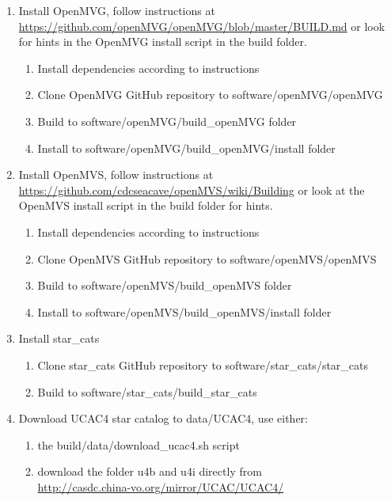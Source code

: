 \begin{enumerate}
\begin{enumerate}
    \end{enumerate}{}
    \item Install OpenMVG, follow instructions at \\ \url{https://github.com/openMVG/openMVG/blob/master/BUILD.md} or look for hints in the OpenMVG install script in the build folder.
    \begin{enumerate}
        \item Install dependencies according to instructions
        \item Clone OpenMVG GitHub repository to software/openMVG/openMVG 
        \item Build to software/openMVG/build\_openMVG folder
        \item Install to software/openMVG/build\_openMVG/install folder
    \end{enumerate}
    \item Install OpenMVS, follow instructions at \\ \url{https://github.com/cdcseacave/openMVS/wiki/Building} or look at the OpenMVS install script in the build folder for hints.
    \begin{enumerate}
        \item Install dependencies according to instructions
        \item Clone OpenMVS GitHub repository to software/openMVS/openMVS 
        \item Build to software/openMVS/build\_openMVS folder
        \item Install to software/openMVS/build\_openMVS/install folder
    \end{enumerate}
    \item Install star\_cats
    \begin{enumerate}
        \item Clone star\_cats GitHub repository to software/star\_cats/star\_cats \\ 
        \item Build to software/star\_cats/build\_star\_cats 
    \end{enumerate}
    \item Download UCAC4 star catalog to data/UCAC4, use either:
    \begin{enumerate}
        \item the build/data/download\_ucac4.sh script
        \item download the folder u4b and u4i directly from \\ \url{http://casdc.china-vo.org/mirror/UCAC/UCAC4/}
    \end{enumerate}
\end{enumerate}{}

